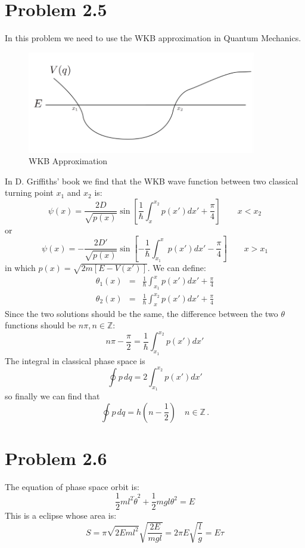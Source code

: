 \documentclass{article}
\begin{document}
\section*{Problem 2.5}
In this problem we need to use the WKB approximation in Quantum Mechanics. 
\begin{figure}[!htp]
\centering
\includegraphics[width=10cm]{./figures/2.3-2.5/pic1.png}
\caption{WKB Approximation}
\end{figure}
In D. Griffiths' book we find that the WKB wave function between two classical turning point $x_1$ and $x_2$ is:
$$
\psi(x) = \frac{2D}{\sqrt{p(x)}}\sin\left[\frac{1}{\hbar}\int_x^{x_2}p(x')dx' + \frac{\pi}{4}\right]\quad\quad x< x_2
$$
or
$$
\psi(x) = -\frac{2D'}{\sqrt{p(x)}}\sin\left[-\frac{1}{\hbar}\int_{x_1}^{x}p(x')dx'-\frac{\pi}{4}\right]\quad\quad x>x_1
$$
in which $p(x) = \sqrt{2m[E-V(x')]}$. We can define:
\begin{eqnarray*}
\theta_1(x) &=& \frac{1}{\hbar}\int_{x_1}^{x}p(x')dx'+\frac{\pi}{4}\\
\theta_2(x) &=& \frac{1}{\hbar}\int_x^{x_2}p(x')dx' + \frac{\pi}{4}
\end{eqnarray*}
Since the two solutions should be the same, the difference between the two $\theta$ functions should be $n\pi, n\in\mathbb{Z}$: 
\begin{equation}
n\pi-\frac{\pi}{2} = \frac{1}{\hbar}\int_{x_1}^{x_2}p(x')dx'
\end{equation}
The integral in classical phase space is
$$
\oint p\,dq = 2 \int_{x_1}^{x_2}p(x')dx'
$$
so finally we can find that 
\begin{equation}
\oint p\,dq = h\left(n-\frac{1}{2}\right)\quad n\in\mathbb{Z}\,.
\end{equation}
\section*{Problem 2.6}
The equation of phase space orbit is:
$$
\frac{1}{2}ml^{2}\dot{\theta}^{2}+\frac{1}{2}mgl\theta^{2}=E
$$
This is a eclipse whose area is:
$$
S=\pi \sqrt{2Eml^{2}}\sqrt{\frac{2E}{mgl}}=2\pi E \sqrt{\frac{l}{g}}=E \tau
$$
\end{document}
